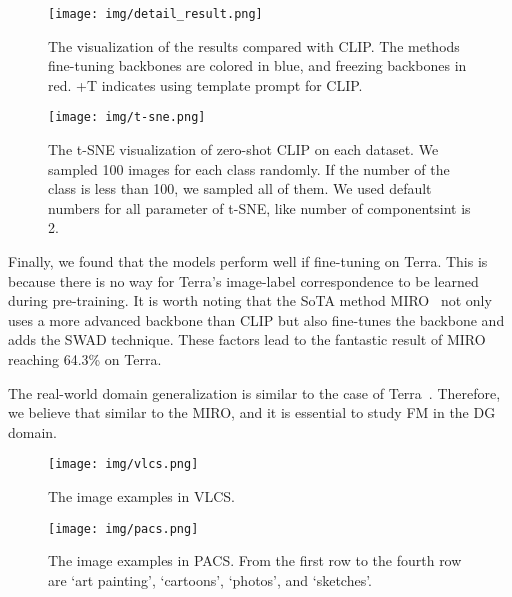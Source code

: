 \documentclass[letterpaper]{article} \usepackage[]{aaai23}
\begin{document}
\begin{figure}[h]
\begin{center}
\texttt{[image: img/detail\_result.png]}
\end{center}
  \caption{
  The visualization of the results compared with CLIP.
  The methods fine-tuning backbones are colored in blue, and freezing backbones in red.
  +T indicates using template prompt for CLIP.
}
\label{fig:detail_result}
\end{figure}

\begin{figure}[h]
\begin{center}
\texttt{[image: img/t-sne.png]}
\end{center}
  \caption{
  The t-SNE visualization of zero-shot CLIP on each dataset.
  We sampled 100 images for each class randomly. If the number of the class is less than 100, we sampled all of them.
  We used default numbers for all parameter of t-SNE, like number of componentsint is 2.
}
\label{fig:t-sne}
\end{figure}


Finally, we found that the models perform well if fine-tuning on Terra.
This is because there is no way for Terra's image-label correspondence to be learned during pre-training.
It is worth noting that the SoTA method MIRO~\cite{cha2022domain} not only uses a more advanced backbone than CLIP but also fine-tunes the backbone and adds the SWAD technique. 
These factors lead to the fantastic result of MIRO reaching 64.3\% on Terra.

The real-world domain generalization is similar to the case of Terra~\cite{koh2021wilds}. Therefore, we believe that similar to the MIRO, and it is essential to study FM in the DG domain.


\begin{figure*}[h]
\begin{center}
\texttt{[image: img/vlcs.png]}
\end{center}
  \caption{
  The image examples in VLCS.
}
\label{fig:vlcs}
\end{figure*}

\begin{figure*}[h]
\begin{center}
\texttt{[image: img/pacs.png]}
\end{center}
  \caption{
  The image examples in PACS.
  From the first row to the fourth row are `art painting', `cartoons', `photos', and `sketches'.
}
\end{figure*}
\end{document}
